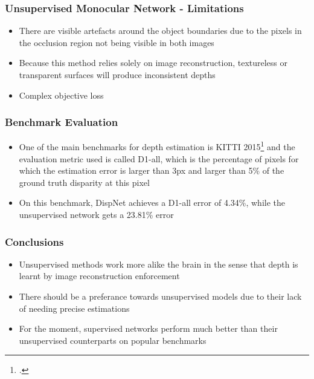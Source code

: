 \documentclass{beamer}
\begin{document}
\begin{frame}
\frametitle{Unsupervised Monocular Network - Limitations}
\center
\begin{itemize}
	\item There are visible artefacts around the object boundaries due to the pixels in the occlusion region not being visible in both images
	\item Because this method relies solely on image reconstruction, textureless or transparent surfaces will produce inconsistent depths
	\item Complex objective loss
\end{itemize}
\end{frame}

\begin{frame}
\frametitle{Benchmark Evaluation}
\center
\begin{itemize}
	\item One of the main benchmarks for depth estimation is KITTI 2015\footcite{Menze2015CVPR} and the evaluation metric used is called D1-all, which is the percentage of pixels for which the estimation error is larger than 3px and larger than 5\% of the ground truth disparity at this pixel
	\item On this benchmark, DispNet achieves a D1-all error of 4.34\%, while the unsupervised network gets a 23.81\% error
\end{itemize}
\end{frame}

\begin{frame}
\frametitle{Conclusions}
\center
\begin{itemize}
	\item Unsupervised methods work more alike the brain in the sense that depth is learnt by image reconstruction enforcement
	\item There should be a preferance towards unsupervised models due to their lack of needing precise estimations
	\item For the moment, supervised networks perform much better than their unsupervised counterparts on popular benchmarks
\end{itemize}
\end{frame}
\end{document}
